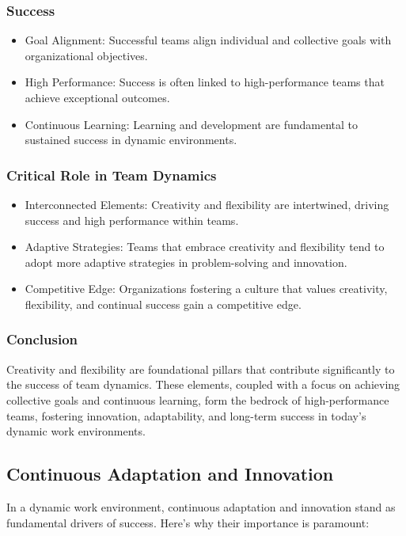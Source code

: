 \documentclass[a4paper, twoside]{article}
\begin{document}
\subsubsection{Success}
\begin{itemize}
    \item  {Goal Alignment:} Successful teams align individual and collective goals with organizational objectives.
    \item  {High Performance:} Success is often linked to high-performance teams that achieve exceptional outcomes.
    \item {Continuous Learning:} Learning and development are fundamental to sustained success in dynamic environments.
\end{itemize}

\subsubsection{Critical Role in Team Dynamics}
\begin{itemize}
    \item {Interconnected Elements:} Creativity and flexibility are intertwined, driving success and high performance within teams.
    \item {Adaptive Strategies:} Teams that embrace creativity and flexibility tend to adopt more adaptive strategies in problem-solving and innovation.
    \item {Competitive Edge:} Organizations fostering a culture that values creativity, flexibility, and continual success gain a competitive edge.
\end{itemize}

\subsubsection{Conclusion}
Creativity and flexibility are foundational pillars that contribute significantly to the success of team dynamics. These elements, coupled with a focus on achieving collective goals and continuous learning, form the bedrock of high-performance teams, fostering innovation, adaptability, and long-term success in today's dynamic work environments.


\subsection{Continuous Adaptation and Innovation}
In a dynamic work environment, continuous adaptation and innovation stand as fundamental drivers of success. Here's why their importance is paramount:
\end{document}
